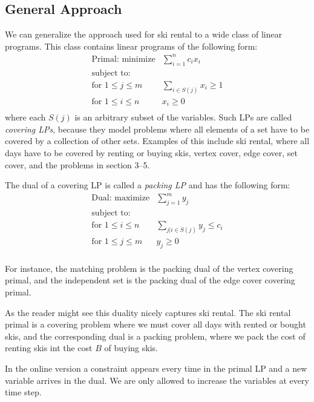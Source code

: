 \subsection{General Approach}
We can generalize the approach used for ski rental to a wide class of linear programs.
This class contains linear programs of the following form:
\[
	\begin{array}{lr}
	\textrm{Primal: minimize}   & \sum_{i=1}^n c_i x_i   \\
	\textrm{subject to:} & \\
	\textrm{for $1 \le j \le m$} & \sum_{i \in S(j)} x_i  \ge 1  \\
	\textrm{for $1 \le i \le n$} & x_i  \ge 0  \\
	\end{array}
\]
where each $S(j)$ is an arbitrary subset of the variables.
Such LPs are called \emph{covering LPs}, because they model problems where all elements of a set have to be covered by a collection of other sets.
Examples of this include ski rental, where all days have to be covered by renting or buying skis, vertex cover, edge cover, set cover, and the problems in section 3--5.

The dual of a covering LP is called a \emph{packing LP} and has the following form:
\[
	\begin{array}{lr}
	\textrm{Dual: maximize}   & \sum_{j=1}^m y_j   \\
	\textrm{subject to:} & \\
	\textrm{for $1 \le i \le n$} & \sum_{j | i \in S(j)} y_j  \le c_i  \\
	\textrm{for $1 \le j \le m$} & y_j \ge 0  \\
	\end{array}
\]

For instance, the matching problem is the packing dual of the vertex covering primal, and the independent set is the packing dual of the edge cover covering primal.

As the reader might see this duality nicely captures ski rental.
The ski rental primal is a covering problem where we must cover all days with rented or bought skis, and the corresponding dual is a packing problem, where we pack the cost of renting skis int the cost $B$ of buying skis.

In the online version a constraint appears every time in the primal LP and a new variable arrives in the dual. We are only allowed to increase the variables at every time step.

